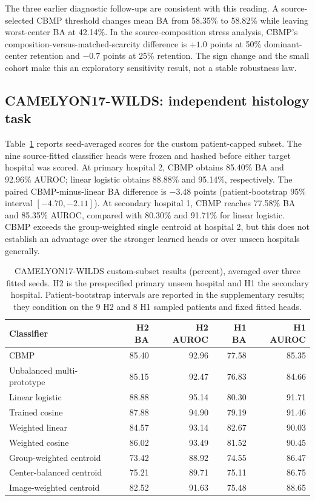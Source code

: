 The three earlier diagnostic follow-ups are consistent with this reading. A source-selected CBMP threshold changes mean BA from 58.35\% to 58.82\% while leaving worst-center BA at 42.14\%. In the source-composition stress analysis, CBMP's composition-versus-matched-scarcity difference is $+1.0$ points at 50\% dominant-center retention and $-0.7$ points at 25\% retention. The sign change and the small cohort make this an exploratory sensitivity result, not a stable robustness law.

\subsection{CAMELYON17-WILDS: independent histology task}
Table~\ref{tab:camelyon_results} reports seed-averaged scores for the custom patient-capped subset. The nine source-fitted classifier heads were frozen and hashed before either target hospital was scored. At primary hospital 2, CBMP obtains 85.40\% BA and 92.96\% AUROC; linear logistic obtains 88.88\% and 95.14\%, respectively. The paired CBMP-minus-linear BA difference is $-3.48$ points (patient-bootstrap 95\% interval $[-4.70,-2.11]$). At secondary hospital 1, CBMP reaches 77.58\% BA and 85.35\% AUROC, compared with 80.30\% and 91.71\% for linear logistic. CBMP exceeds the group-weighted single centroid at hospital 2, but this does not establish an advantage over the stronger learned heads or over unseen hospitals generally.

\begin{table}[t]
\centering\small
\setlength{\tabcolsep}{5pt}
\begin{tabular}{lrrrr}
\hline
Classifier & H2 BA & H2 AUROC & H1 BA & H1 AUROC \\
\hline
CBMP & 85.40 & 92.96 & 77.58 & 85.35 \\
Unbalanced multi-prototype & 85.15 & 92.47 & 76.83 & 84.66 \\
Linear logistic & 88.88 & 95.14 & 80.30 & 91.71 \\
Trained cosine & 87.88 & 94.90 & 79.19 & 91.46 \\
Weighted linear & 84.57 & 93.14 & 82.67 & 90.03 \\
Weighted cosine & 86.02 & 93.49 & 81.52 & 90.45 \\
Group-weighted centroid & 73.42 & 88.92 & 74.55 & 86.47 \\
Center-balanced centroid & 75.21 & 89.71 & 75.11 & 86.75 \\
Image-weighted centroid & 82.52 & 91.63 & 75.48 & 88.65 \\
\hline
\end{tabular}
\caption{CAMELYON17-WILDS custom-subset results (percent), averaged over three fitted seeds. H2 is the prespecified primary unseen hospital and H1 the secondary hospital. Patient-bootstrap intervals are reported in the supplementary results; they condition on the 9 H2 and 8 H1 sampled patients and fixed fitted heads.}
\label{tab:camelyon_results}
\end{table}

